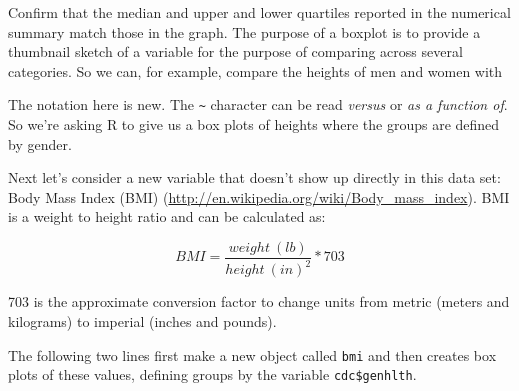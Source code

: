 \documentclass[]{book}
\newenvironment{Shaded}{\begin{snugshade}}{\end{snugshade}}
\newcommand{\DecValTok}[1]{\textcolor[rgb]{0.00,0.00,0.81}{#1}}
\newcommand{\KeywordTok}[1]{\textcolor[rgb]{0.13,0.29,0.53}{\textbf{#1}}}
\newcommand{\NormalTok}[1]{#1}
\newcommand{\OperatorTok}[1]{\textcolor[rgb]{0.81,0.36,0.00}{\textbf{#1}}}
\newcommand{\StringTok}[1]{\textcolor[rgb]{0.31,0.60,0.02}{#1}}
\theoremstyle{definition}
\theoremstyle{definition}
\theoremstyle{definition}
\theoremstyle{remark}
\begin{document}
\begin{Shaded}
\end{Shaded}

Confirm that the median and upper and lower quartiles reported in the
numerical summary match those in the graph. The purpose of a boxplot is
to provide a thumbnail sketch of a variable for the purpose of comparing
across several categories. So we can, for example, compare the heights
of men and women with

\begin{Shaded}
\end{Shaded}

The notation here is new. The \texttt{\textasciitilde{}} character can
be read \emph{versus} or \emph{as a function of}. So we're asking R to
give us a box plots of heights where the groups are defined by gender.

Next let's consider a new variable that doesn't show up directly in this
data set: Body Mass Index (BMI)
(\url{http://en.wikipedia.org/wiki/Body_mass_index}). BMI is a weight to
height ratio and can be calculated as:

\[ BMI = \frac{weight~(lb)}{height~(in)^2} * 703 \]

703 is the approximate conversion factor to change units from metric
(meters and kilograms) to imperial (inches and pounds).

The following two lines first make a new object called \texttt{bmi} and
then creates box plots of these values, defining groups by the variable
\texttt{cdc\$genhlth}.

\begin{Shaded}
\end{Shaded}
\end{document}
